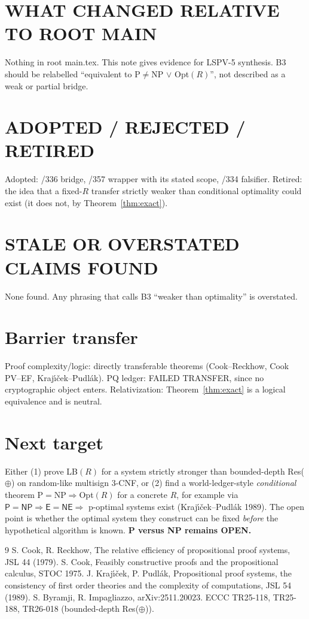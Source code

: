 \documentclass[11pt]{article}
\theoremstyle{definition}\newtheorem{definition}[theorem]{Definition}
\begin{document}
\section*{WHAT CHANGED RELATIVE TO ROOT MAIN}
Nothing in root main.tex. This note gives evidence for LSPV-5 synthesis. B3 should be relabelled
``equivalent to P$\ne$NP $\lor$ Opt$(R)$'', not described as a weak or partial bridge.
\section*{ADOPTED / REJECTED / RETIRED}
Adopted: /336 bridge, /357 wrapper with its stated scope, /334 falsifier. Retired: the idea that a fixed-$R$
transfer strictly weaker than conditional optimality could exist (it does not, by Theorem~\ref{thm:exact}).
\section*{STALE OR OVERSTATED CLAIMS FOUND}
None found. Any phrasing that calls B3 ``weaker than optimality'' is overstated.
\section*{Barrier transfer}
Proof complexity/logic: directly transferable theorems (Cook--Reckhow, Cook PV--EF, Kraj\'{\i}\v{c}ek--Pudl\'ak).
PQ ledger: FAILED TRANSFER, since no cryptographic object enters. Relativization: Theorem~\ref{thm:exact} is a
logical equivalence and is neutral.
\section*{Next target}
Either (1) prove LB$(R)$ for a system strictly stronger than bounded-depth Res($\oplus$) on random-like
multisign 3-CNF, or (2) find a world-ledger-style \emph{conditional} theorem P$=$NP$\Rightarrow$Opt$(R)$ for a
concrete $R$, for example via $\mathsf P=\mathsf{NP}\Rightarrow\mathsf E=\mathsf{NE}\Rightarrow$ p-optimal systems exist
(Kraj\'{\i}\v{c}ek--Pudl\'ak 1989). The open point is whether the optimal system they construct can be fixed
\emph{before} the hypothetical algorithm is known. \textbf{P versus NP remains OPEN.}

\begin{thebibliography}{9}
 S. Cook, R. Reckhow, The relative efficiency of propositional proof systems, JSL 44 (1979).
 S. Cook, Feasibly constructive proofs and the propositional calculus, STOC 1975.
 J. Kraj\'{\i}\v{c}ek, P. Pudl\'ak, Propositional proof systems, the consistency of first order theories and the complexity of computations, JSL 54 (1989).
 S. Byramji, R. Impagliazzo, arXiv:2511.20023.
 ECCC TR25-118, TR25-188, TR26-018 (bounded-depth Res($\oplus$)).
\end{thebibliography}
\end{document}
